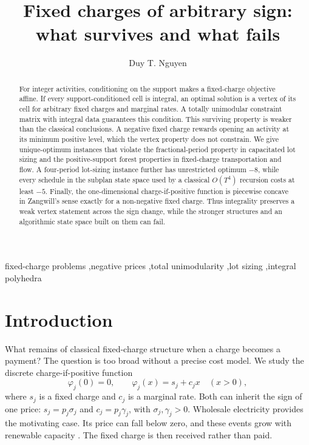 \documentclass[review,11pt]{elsarticle}
\theoremstyle{remark}
\theoremstyle{definition}
\begin{document}
\begin{frontmatter}
\title{Fixed charges of arbitrary sign: what survives and what fails}
\author{Duy T. Nguyen}
\address{Independent Researcher, Ho Chi Minh City, Vietnam}

\begin{abstract}
For integer activities, conditioning on the support makes a fixed-charge objective
affine. If every support-conditioned cell is integral, an optimal solution is a vertex
of its cell for arbitrary fixed charges and marginal rates. A totally unimodular
constraint matrix with integral data guarantees this condition. This
surviving property is weaker than the classical conclusions. A negative fixed charge
rewards opening an activity at its minimum positive level, which the vertex property does
not constrain. We give unique-optimum instances that violate the fractional-period
property in capacitated lot sizing and the positive-support forest properties in
fixed-charge transportation and flow. A four-period lot-sizing instance further has
unrestricted optimum $-8$, while every schedule in the subplan state space used by a
classical $O(T^4)$ recursion costs at least $-5$. Finally, the one-dimensional
charge-if-positive function is piecewise concave in Zangwill's sense exactly for a
non-negative fixed charge. Thus integrality preserves a weak vertex statement across the
sign change, while the stronger structures and an algorithmic state space built on them
can fail.
\end{abstract}

\begin{keyword}
fixed-charge problems \sep negative prices \sep total unimodularity \sep lot sizing
\sep integral polyhedra
\end{keyword}
\end{frontmatter}
\linenumbers

\section{Introduction}

What remains of classical fixed-charge structure when a charge becomes a payment? The
question is too broad without a precise cost model. We study the discrete
charge-if-positive function
\begin{equation}\label{eq:fc}
\varphi_j(0)=0,\qquad \varphi_j(x)=s_j+c_jx\quad(x>0),
\end{equation}
where $s_j$ is a fixed charge and $c_j$ is a marginal rate. Both can inherit the sign of
one price: $s_j=p_j\sigma_j$ and $c_j=p_j\gamma_j$, with
$\sigma_j,\gamma_j>0$. Wholesale electricity provides the motivating case. Its price can
fall below zero, and these events grow with renewable capacity \cite{seel21}. The fixed
charge is then received rather than paid.
\end{document}
